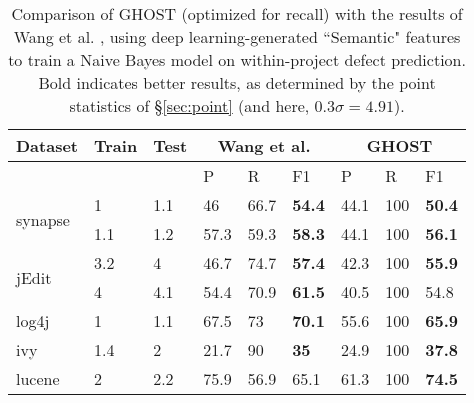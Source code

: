 \begin{table}[!b]
\centering
\caption{Comparison of GHOST (optimized for recall) with the results of Wang et al. \cite{wang2016automatically}, using deep learning-generated ``Semantic" features to train a Naive Bayes model on within-project defect prediction. Bold indicates better results, as determined by the point statistics of \S\ref{sec:point} (and here, $0.3 \sigma = 4.91$).}
\label{tab:wpdp}
\begin{tabular}{l|ll|lll|lll}
\toprule
Dataset & Train & Test & \multicolumn{3}{c}{Wang et al.} & \multicolumn{3}{c}{GHOST}    \\
\midrule
                         &                        &                                          & P    & R    & F1             & P    & R    & F1                \\
                         \midrule
\multirow{2}{*}{synapse} & 1                      & 1.1                                   & 46   & 66.7 & \cellcolor{blue!10}\textbf{54.4}           & 44.1 & 100  & \cellcolor{blue!10}\textbf{50.4}              \\
                         & 1.1                    & 1.2                                  & 57.3 & 59.3 & \cellcolor{blue!10}\textbf{58.3}           & 44.1 & 100  & \cellcolor{blue!10}\textbf{56.1}              \\
                         \midrule
\multirow{2}{*}{jEdit}   & 3.2                    & 4                                      & 46.7 & 74.7 & \cellcolor{blue!10}\textbf{57.4}           & 42.3 & 100  & \cellcolor{blue!10}\textbf{55.9}              \\
                         & 4                      & 4.1                                   & 54.4 & 70.9 & \cellcolor{blue!10}\textbf{61.5}           & 40.5 & 100  & 54.8              \\ \midrule
log4j                    & 1                      & 1.1                                   & 67.5 & 73   & \cellcolor{blue!10}\textbf{70.1}           & 55.6 & 100  & \cellcolor{blue!10}\textbf{65.9}              \\ \midrule
ivy                      & 1.4                    & 2                                     & 21.7 & 90   & \cellcolor{blue!10}\textbf{35}             & 24.9 & 100  & \cellcolor{blue!10}\textbf{37.8}              \\ \midrule
\multirow{2}{*}{lucene}  & 2                      & 2.2                                   & 75.9 & 56.9 & 65.1           & 61.3 & 100  & \cellcolor{blue!10}\textbf{74.5}              \\

\end{tabular}
\end{table}
